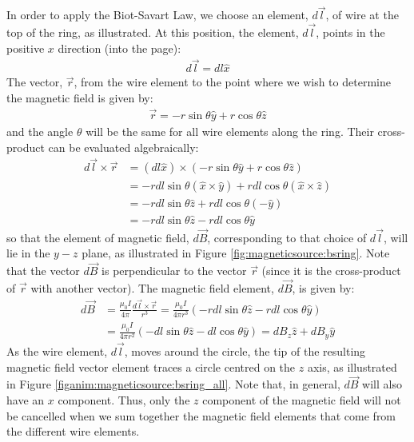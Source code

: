 In order to apply the Biot-Savart Law, we choose an element, $d\vec l$, of wire at the top of the ring, as illustrated. At this position, the element, $d\vec l$, points in the positive $x$ direction (into the page):
\begin{align*}
d\vec l = dl \hat x
\end{align*}
The vector, $\vec r$, from the wire element to the point where we wish to determine the magnetic field is given by:
\begin{align*}
\vec r =  - r\sin\theta \hat y+r\cos\theta \hat z
\end{align*}
and the angle $\theta$ will be the same for all wire elements along the ring. Their cross-product can be evaluated algebraically:
\begin{align*}
d\vec l \times \vec r &= (dl \hat x) \times ( - r\sin\theta \hat y+r\cos\theta \hat z)\\
&=-rdl\sin\theta (\hat x \times \hat y) + rdl\cos\theta (\hat x \times \hat z)\\
&=-rdl\sin\theta\hat z + rdl\cos\theta (-\hat y)\\
&=-rdl\sin\theta\hat z - rdl\cos\theta \hat y 
\end{align*}
so that the element of magnetic field, $d\vec B$, corresponding to that choice of $d\vec l$, will lie in the $y-z$ plane, as illustrated in Figure \ref{fig:magneticsource:bsring}. Note that the vector $d\vec B$ is perpendicular to the vector $\vec r$ (since it is the cross-product of $\vec r$ with another vector). The magnetic field element, $d\vec B$, is given by:
\begin{align*}
d\vec B &= \frac{\mu_0 I}{4\pi}\frac{d\vec l\times \vec r}{r^3}= \frac{\mu_0 I}{4\pi r^3}(-rdl\sin\theta\hat z - rdl\cos\theta \hat y )\\
&=\frac{\mu_0 I}{4\pi r^2}(-dl\sin\theta \hat z - dl\cos\theta \hat y)=dB_z\hat z + dB_y \hat y
\end{align*}
As the wire element, $d\vec l$, moves around the circle, the tip of the resulting magnetic field vector element traces a circle centred on the $z$ axis, as illustrated in Figure \ref{figanim:magneticsource:bsring_all}. Note that, in general, $d\vec B$ will also have an $x$ component. Thus, only the $z$ component of the magnetic field will not be cancelled when we sum together the magnetic field elements that come from the different wire elements.

